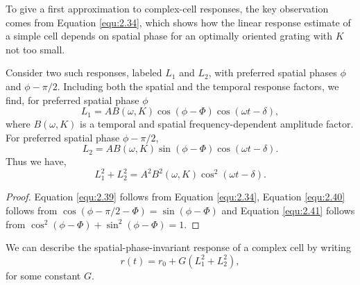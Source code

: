\begin{rem}
  To give a first approximation to complex-cell responses, the key
  observation comes from Equation \ref{equ:2.34}, which shows how the linear response estimate of a simple cell depends on spatial phase for an optimally oriented grating with $K$ not too small.
\end{rem}

\begin{prop}
  Consider two such responses, labeled $L_1$ and $L_2$, with preferred spatial phases $\phi$ and $\phi-\pi/2$. Including both the spatial and the temporal response factors, we find, for preferred spatial phase $\phi$
  \begin{equation}
    \label{equ:2.39}
    L_1=AB(\omega,K)\cos(\phi-\Phi)\cos(\omega t-\delta),
  \end{equation}
  where $B(\omega, K)$ is a temporal and spatial frequency-dependent amplitude factor. For preferred spatial phase $\phi-\pi/2$,
  \begin{equation}
    \label{equ:2.40}
    L_2=AB(\omega,K)\sin(\phi-\Phi)\cos(\omega t-\delta).
  \end{equation}
  Thus we have,
  \begin{equation}
    \label{equ:2.41}
    L_1^2+L_2^2=A^2B^2(\omega,K)\cos^2(\omega t-\delta).
  \end{equation}
\end{prop}
\begin{proof}
  Equation \ref{equ:2.39} follows from Equation \ref{equ:2.34}, Equation \ref{equ:2.40} follows from $\cos(\phi-\pi/2-\Phi) = \sin(\phi-\Phi)$ and Equation \ref{equ:2.41} follows from $\cos^2(\phi-\Phi)+\sin^2(\phi-\Phi) = 1$.
\end{proof}

\begin{coro}
  \label{coro:spatialPhaseInvariantResponse}
  We can describe the spatial-phase-invariant response of a complex cell by writing
  \begin{equation}
    \label{equ:2.42}
    r(t)=r_0+G(L_1^2+L_2^2),
  \end{equation}
  for some constant $G$. 
\end{coro}

